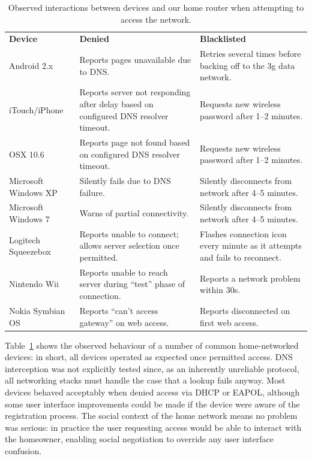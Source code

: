 \begin{table} \centering\footnotesize
  \begin{tabular}{lp{}p{}} \bf Device & \bf Denied &
    \bf Blacklisted\\

Android 2.x & Reports pages unavailable due to DNS.  & Retries several times
before backing off to the 3g data network.\\

iTouch/iPhone & Reports server not responding after delay based on configured
DNS resolver timeout.  & Requests new wireless password after 1--2 minutes.\\

OSX 10.6 & Reports page not found based on configured DNS resolver timeout.  &
Requests new wireless password after 1--2 minutes.\\

Microsoft Windows XP & Silently fails due to DNS failure.  & Silently
disconnects from network after 4--5 minutes.\\

Microsoft Windows 7 & Warns of partial connectivity.  & Silently disconnects
from network after 4--5 minutes.\\

Logitech Squeezebox & Reports unable to connect; allows server selection once
permitted.  & Flashes connection icon every minute as it attempts and fails to
reconnect.  \\ 

Nintendo Wii & Reports unable to reach server during ``test'' phase of
connection.  & Reports a network problem within 30s.\\

Nokia Symbian OS & Reports ``can't access gateway'' on web access.  & Reports
disconnected on first web access.\\ \end{tabular}
\caption{\label{t:devices}Observed interactions between devices and our home
  router when attempting to access the network.}
\end{table}

Table~\ref{t:devices} shows the observed behaviour of a number of common
home-networked devices: in short, all devices operated as expected once
permitted access.  DNS interception was not explicitly tested since, as an
inherently unreliable protocol, all networking stacks must handle the case that
a lookup fails anyway.  Most devices behaved acceptably when denied access via
DHCP or EAPOL, although some user interface improvements could be made if the
device were aware of the registration process.  The social context of the home
network means no problem was serious: in practice the user requesting access
would be able to interact with the homeowner, enabling social negotiation to
override any user interface confusion. 

